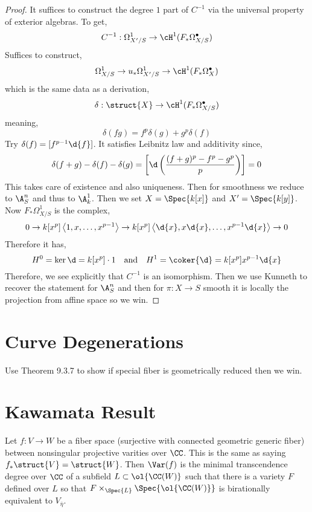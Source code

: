 \documentclass[12pt]{article}
\begin{document}
\begin{proof}
It suffices to construct the degree $1$ part of $C^{-1}$ via the universal property of exterior algebras. To get,
\[ C^{-1} : \Omega^1_{X'/S} \to \cH^1(F_* \Omega^\bullet_{X/S}) \]
Suffices to construct,
\[ \Omega_{X/S}^1 \to u_* \Omega_{X'/S}^1 \to \cH^1(F_* \Omega_X^\bullet) \]
which is the same data as a derivation,
\[ \delta : \struct{X} \to \cH^1(F_* \Omega_{X/S}^\bullet) \]
meaning,
\[ \delta(fg) = f^p \delta(g) + g^p \delta(f) \]
Try $\delta(f) = [f^{p-1} \d{f}]$. It satisfies Leibnitz law and additivity since,
\[ \delta(f+g) - \delta(f) - \delta(g) = \left[ \d \left( \frac{(f+g)^p - f^p - g^p}{p} \right) \right] = 0 \]
This takes care of existence and also uniqueness. Then for smoothness we reduce to $\A^n_S$ and thus to $\A^1_{k}$. Then we set $X = \Spec{k[x]}$ and $X' = \Spec{k[y]}$. Now $F_* \Omega^1_{X/S}$ is the complex,
\[ 0 \to k[x^p] \left< 1, x, \dots, x^{p-1} \right> \to k[x^p] \left< \d{x}, x \d{x}, \dots, x^{p-1} \d{x} \right> \to 0 \]
Therefore it has,
\[ H^0 = \ker{\d} = k[x^p] \cdot 1 \quad \text{and} \quad H^1 = \coker{\d} = k[x^p] x^{p-1} \d{x} \]
Therefore, we see explicitly that $C^{-1}$ is an isomorphism. Then we use Kunneth to recover the statement for $\A^n_S$ and then for $\pi : X \to S$ smooth it is \etale locally the projection from affine space so we win.
\end{proof}

\section{Curve Degenerations}

Use Theorem 9.3.7 to show if special fiber is geometrically reduced then we win.

\section{Kawamata Result}

\begin{defn}
Let $f : V \to W$ be a fiber space (surjective with connected geometric generic fiber) between nonsingular projective varities over $\CC$. This is the same as saying $f_* \struct{V} = \struct{W}$. Then $\Var(f)$ is the minimal transcendence degree over $\CC$ of a subfield $L \subset \ol{\CC(W)}$ such that there is a variety $F$ defined over $L$ so that $F \times_{\Spec{L}} \Spec{\ol{\CC(W)}}$ is birationally equivalent to $V_{\bar{\eta}}$.
\end{defn}
\end{document}
